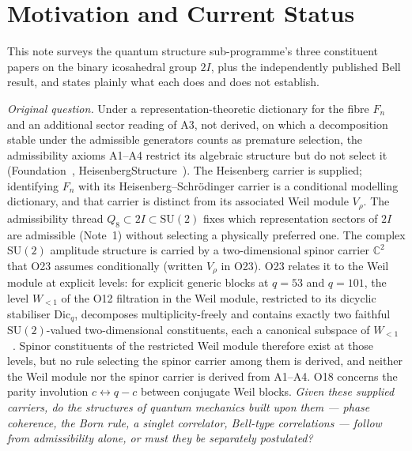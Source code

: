 \documentclass[11pt,a4paper]{article}
\theoremstyle{definition}
\newcommand{\SU}{\mathrm{SU}}
\newcommand{\Vr}{V_\rho}
\newcommand{\twoI}{2I}
\begin{document}
  \newpage
  \tableofcontents

  \newpage

  \section{Motivation and Current Status}
    \label{sec:motivation}

    This note surveys the quantum structure sub-programme's three constituent papers on the
    binary icosahedral group $\twoI$, plus the independently published Bell result, and states
    plainly what each does and does not establish.

    \medskip
    \noindent\textit{Original question.}
    Under a representation-theoretic dictionary for the fibre $F_n$ and an additional sector reading of A3,
    not derived, on which a decomposition stable under the admissible generators counts as premature selection,
    the admissibility axioms A1--A4 restrict its algebraic structure but do not select it
    (Foundation~\cite{Beau2026m}, HeisenbergStructure~\cite{Beau2026HeisenbergStructure}).
    The Heisenberg carrier is supplied; identifying $F_n$ with its Heisenberg--Schr\"odinger carrier is a
    conditional modelling dictionary, and that carrier is distinct from its associated Weil module $\Vr$.
    The admissibility thread $Q_8 \subset \twoI \subset \SU(2)$ fixes which representation sectors of
    $\twoI$ are admissible (Note~1) without selecting a physically preferred one.
    The complex $\SU(2)$ amplitude structure is carried by a two-dimensional spinor carrier $\mathbb{C}^2$
    that O23 assumes conditionally (written $V_\rho$ in O23).
    O23 relates it to the Weil module at explicit levels: for explicit generic blocks at $q = 53$ and $q = 101$,
    the level $W_{<1}$ of the O12 filtration in the Weil module, restricted to its dicyclic stabiliser
    $\mathrm{Dic}_q$, decomposes
    multiplicity-freely and contains exactly two faithful $\SU(2)$-valued two-dimensional constituents, each a
    canonical subspace of $W_{<1}$~\cite{Beau2026a27}.
    Spinor constituents of the restricted Weil module therefore exist at those levels, but no rule selecting
    the spinor carrier among them is derived, and neither the Weil module nor the spinor carrier is derived
    from A1--A4.
    O18 concerns the parity involution $c \leftrightarrow q-c$ between conjugate Weil blocks.
    \textit{Given these supplied carriers, do the structures of quantum mechanics built upon them --- phase
    coherence, the Born
    rule, a singlet correlator, Bell-type correlations --- follow from admissibility alone, or
    must they be separately postulated?}
\end{document}
